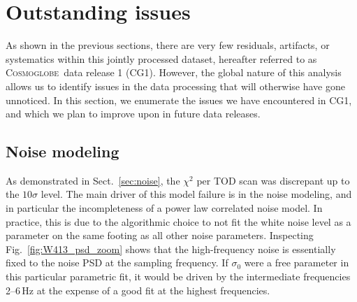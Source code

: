 \documentclass[twocolumn]{../../common/aa}
\newcommand{\cosmoglobe}{\textsc{Cosmoglobe}}
\begin{document}






















\section{Outstanding issues}
\label{sec:issues}

As shown in the previous sections, there are very few residuals, artifacts, or systematics within this jointly processed dataset, hereafter referred to as \cosmoglobe\ data release 1 (CG1). However, the global nature of this analysis allows us to identify issues in the data processing that will otherwise have gone unnoticed. In this section, we enumerate the issues we have encountered in CG1, and which we plan to improve upon in future data releases.

\subsection{Noise modeling}
\label{sec:noisemodel}

As demonstrated in Sect.~\ref{sec:noise}, the $\chi^2$ per TOD scan was discrepant up to the $10\sigma$ level. The main driver of this model failure is in the noise modeling, and in particular the incompleteness of a power law correlated noise model. In practice, this is due to the algorithmic choice to not fit the white noise level as a parameter on the same footing as all other noise parameters. Inspecting Fig.~\ref{fig:W413_psd_zoom} shows that the high-frequency noise is essentially fixed to the noise PSD at the sampling frequency. If $\sigma_0$ were a free parameter in this particular parametric fit, it would be driven by the intermediate frequencies 2--6\,Hz at the expense of a good fit at the highest frequencies.
\end{document}
